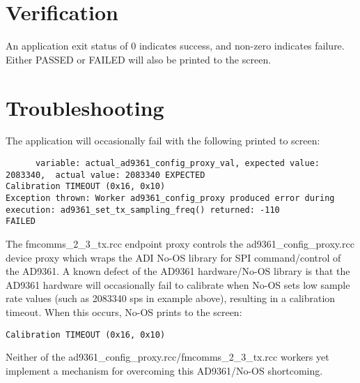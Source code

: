 \section{Verification}
An application exit status of 0 indicates success, and non-zero indicates failure. Either PASSED or FAILED will also be printed to the screen.

\section{Troubleshooting}
The application will occasionally fail with the following printed to screen:
\begin{lstlisting}
      variable: actual_ad9361_config_proxy_val, expected value: 2083340,  actual value: 2083340 EXPECTED
Calibration TIMEOUT (0x16, 0x10)
Exception thrown: Worker ad9361_config_proxy produced error during execution: ad9361_set_tx_sampling_freq() returned: -110
FAILED
\end{lstlisting}
The fmcomms\_2\_3\_tx.rcc endpoint proxy controls the ad9361\_config\_proxy.rcc device proxy which wraps the ADI No-OS library for SPI command/control of the AD9361. A known defect of the AD9361 hardware/No-OS library is that the AD9361 hardware will occasionally fail to calibrate when No-OS sets low sample rate values (such as 2083340 sps in example above), resulting in a calibration timeout. When this occurs, No-OS prints to the screen:
\begin{lstlisting}
Calibration TIMEOUT (0x16, 0x10)
\end{lstlisting}
Neither of the ad9361\_config\_proxy.rcc/fmcomms\_2\_3\_tx.rcc workers yet implement a mechanism for overcoming this AD9361/No-OS shortcoming.



